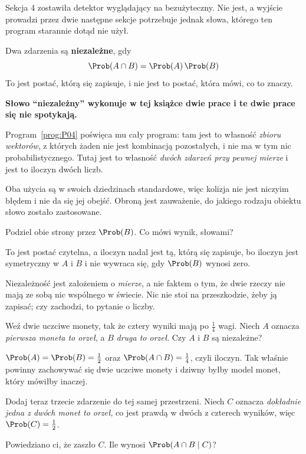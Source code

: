 \begin{fr}
Sekcja 4 zostawiła detektor wyglądający na bezużyteczny. Nie jest, a wyjście
prowadzi przez dwie następne sekcje \dash{} potrzebuje jednak słowa, którego
ten program starannie dotąd nie użył.

Dwa zdarzenia są \textbf{niezależne}, gdy
\[ \Prob(A \cap B) = \Prob(A)\,\Prob(B) \]
To jest postać, którą się zapisuje, i nie jest to postać, która mówi, co to
znaczy.

\begin{notationbox}
\textbf{Słowo \enquote{niezależny} wykonuje w tej książce dwie prace i te dwie
prace się nie spotykają.}

Program~\ref{prog:P04} poświęca mu cały program: tam jest to własność
\emph{zbioru wektorów}, z których żaden nie jest kombinacją pozostałych, i nie
ma w tym nic probabilistycznego. Tutaj jest to własność \emph{dwóch zdarzeń
przy pewnej mierze} i jest to iloczyn dwóch liczb.

Oba użycia są w swoich dziedzinach standardowe, więc kolizja nie jest niczyim
błędem i nie da się jej obejść. Obroną jest zauważenie, do jakiego rodzaju
obiektu słowo zostało zastosowane.
\end{notationbox}

Podziel obie strony przez $\Prob(B)$. Co mówi wynik, słowami?
\dotline
\nextframe
\end{fr}

\begin{fr}

To jest postać czytelna, a iloczyn nadal jest tą, którą się zapisuje, bo
iloczyn jest symetryczny w $A$ i $B$ i nie wywraca się, gdy $\Prob(B)$ wynosi
zero.

Niezależność jest założeniem o \emph{mierze}, a nie faktem o tym, że dwie
rzeczy nie mają ze sobą nic wspólnego w świecie. Nic nie stoi na przeszkodzie,
żeby ją zapisać; czy zachodzi, to pytanie o liczby.

Weź dwie uczciwe monety, tak że cztery wyniki mają po $\frac{1}{4}$ wagi.
Niech $A$ oznacza \emph{pierwsza moneta to orzeł}, a $B$ \emph{druga to
orzeł}. Czy $A$ i $B$ są niezależne?
\dotline
\nextframe
\end{fr}

\begin{fr}

$\Prob(A) = \Prob(B) = \frac{1}{2}$ oraz $\Prob(A \cap B) = \frac{1}{4}$, czyli
iloczyn. Tak właśnie powinny zachowywać się dwie uczciwe monety i dziwny byłby
model monet, który mówiłby inaczej.

Dodaj teraz trzecie zdarzenie do tej samej przestrzeni. Niech $C$ oznacza
\emph{dokładnie jedna z dwóch monet to orzeł}, co jest prawdą w dwóch z
czterech wyników, więc $\Prob(C) = \frac{1}{2}$.

Powiedziano ci, że zaszło $C$. Ile wynosi $\Prob(A \cap B \mid C)$?
\dotline
\nextframe
\end{fr}

